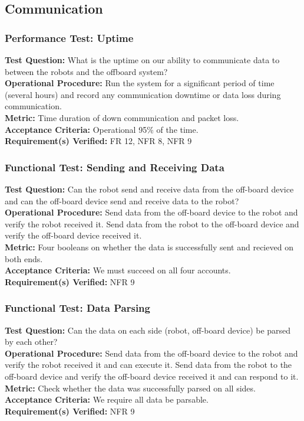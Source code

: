 
\subsection{Communication}
\label{sec:verification_comm}

\subsubsection{Performance Test: Uptime}
\label{test:comm_pt_reliability}
\textbf{Test Question:} What is the uptime on our ability to communicate data to between the robots and the offboard system?  \\
\textbf{Operational Procedure:} Run the system for a significant period of time (several hours) and record any communication downtime or data loss during communication. \\
\textbf{Metric:} Time duration of down communication and packet loss. \\
\textbf{Acceptance Criteria:} Operational 95\% of the time.\\
\textbf{Requirement(s) Verified:} FR 12, NFR 8, NFR 9

\subsubsection{Functional Test: Sending and Receiving Data}
\label{test:comm_ft_send}
\textbf{Test Question:} Can the robot send and receive data from the off-board device and can the off-board device send and receive data to the robot?\\
\textbf{Operational Procedure:} Send data from the off-board device to the robot and verify the robot received it. Send data from the robot to the off-board device and verify the off-board device received it. \\
\textbf{Metric:} Four booleans on whether the data is successfully sent and recieved on both ends. \\
\textbf{Acceptance Criteria:} We must succeed on all four accounts. \\
\textbf{Requirement(s) Verified:} NFR 9

\subsubsection{Functional Test: Data Parsing}
\label{test:comm_ft_parse}
\textbf{Test Question:}  Can the data on each side (robot, off-board device) be parsed by each other? \\
\textbf{Operational Procedure:} Send data from the off-board device to the robot and verify the robot received it and can execute it. Send data from the robot to the off-board device and verify the off-board device received it and can respond to it. \\
\textbf{Metric:} Check whether the data was successfully parsed on all sides. \\
\textbf{Acceptance Criteria:} We require all data be parsable. \\
\textbf{Requirement(s) Verified:} NFR 9 \\
